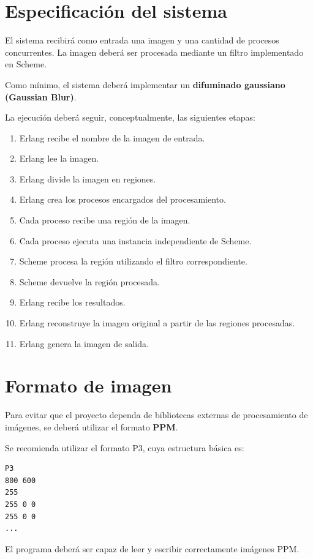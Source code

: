 \documentclass[11pt,a4paper]{article}
\begin{document}
\section{Especificación del sistema}

El sistema recibirá como entrada una imagen y una cantidad de procesos
concurrentes. La imagen deberá ser procesada mediante un filtro
implementado en Scheme.

Como mínimo, el sistema deberá implementar un \textbf{difuminado
gaussiano (Gaussian Blur)}.

La ejecución deberá seguir, conceptualmente, las siguientes etapas:

\begin{enumerate}
\item Erlang recibe el nombre de la imagen de entrada.
\item Erlang lee la imagen.
\item Erlang divide la imagen en regiones.
\item Erlang crea los procesos encargados del procesamiento.
\item Cada proceso recibe una región de la imagen.
\item Cada proceso ejecuta una instancia independiente de Scheme.
\item Scheme procesa la región utilizando el filtro correspondiente.
\item Scheme devuelve la región procesada.
\item Erlang recibe los resultados.
\item Erlang reconstruye la imagen original a partir de las regiones
procesadas.
\item Erlang genera la imagen de salida.
\end{enumerate}

\section{Formato de imagen}

Para evitar que el proyecto dependa de bibliotecas externas de
procesamiento de imágenes, se deberá utilizar el formato
\textbf{PPM}.

Se recomienda utilizar el formato P3, cuya estructura básica es:

\begin{lstlisting}
P3
800 600
255
255 0 0
255 0 0
...
\end{lstlisting}

El programa deberá ser capaz de leer y escribir correctamente imágenes
PPM.
\end{document}
